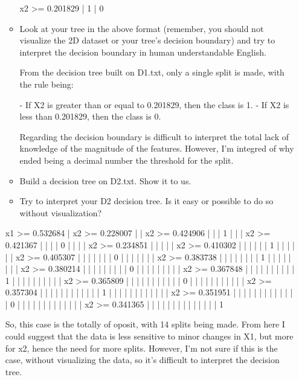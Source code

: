 \documentclass[a4paper]{article}
\theoremstyle{definition}
\begin{document}
\begin{enumerate}
\begin{itemize}
  x2 >= 0.201829
|   1
|   0

  \item Look at your tree in the above format (remember, you should not visualize the 2D dataset or your tree's decision boundary) and try to interpret the decision boundary in human understandable English. 
  
  From the decision tree built on D1.txt, only a single split is made, with the rule being:

  - If X2 is greater than or equal to 0.201829, then the class is 1.
  - If X2 is less than 0.201829, then the class is 0.
  
Regarding the decision boundary is difficult to interpret the total lack of knowledge of the magnitude of the features. However, I'm integred of why ended being a decimal number the threshold for the split.

  \item Build a decision tree on D2.txt.  Show it to us. 

  \item Try to interpret your D2 decision tree. Is it easy or possible to do so without visualization? \\
  
  \end{itemize}

  x1 >= 0.532684
  |   x2 >= 0.228007
  |   |   x2 >= 0.424906
  |   |   |   1
  |   |   |   x2 >= 0.421367
  |   |   |   |   0
  |   |   |   |   x2 >= 0.234851
  |   |   |   |   |   x2 >= 0.410302
  |   |   |   |   |   |   1
  |   |   |   |   |   |   x2 >= 0.405307
  |   |   |   |   |   |   |   0
  |   |   |   |   |   |   |   x2 >= 0.383738
  |   |   |   |   |   |   |   |   1
  |   |   |   |   |   |   |   |   x2 >= 0.380214
  |   |   |   |   |   |   |   |   |   0
  |   |   |   |   |   |   |   |   |   x2 >= 0.367848
  |   |   |   |   |   |   |   |   |   |   1
  |   |   |   |   |   |   |   |   |   |   x2 >= 0.365809
  |   |   |   |   |   |   |   |   |   |   |   0
  |   |   |   |   |   |   |   |   |   |   |   x2 >= 0.357304
  |   |   |   |   |   |   |   |   |   |   |   |   1
  |   |   |   |   |   |   |   |   |   |   |   |   x2 >= 0.351951
  |   |   |   |   |   |   |   |   |   |   |   |   |   0
  |   |   |   |   |   |   |   |   |   |   |   |   |   x2 >= 0.341365
  |   |   |   |   |   |   |   |   |   |   |   |   |   |   1

So, this case is the totally of oposit, with 14 splits being made. From here I could suggest that the data is less sensitive to minor changes in X1, but more for x2, hence the need for more splits. However, I'm not sure if this is the case, without visualizing the data, so it's difficult to interpret the decision tree. 


\end{enumerate}
\end{document}
